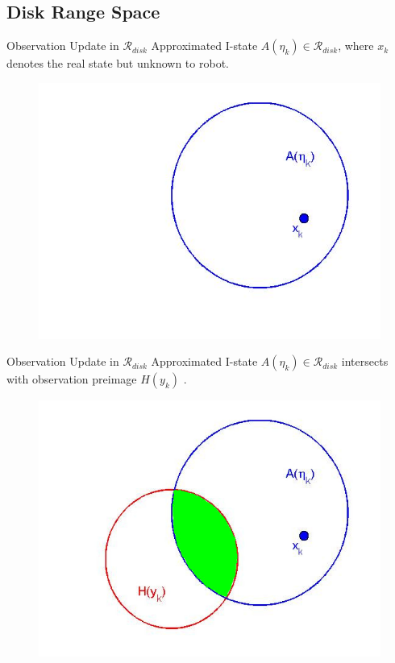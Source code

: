 \documentclass[10pt]{beamer}
\begin{document}
\subsection[Disk Range Space]{Disk Range Space}
\begin{frame}{Observation Update in $\mathcal{R}_{disk}$}
  Approximated I-state $A(\eta_k) \in \mathcal{R}_{disk}$, where $x_k$ denotes
  the real state but unknown to robot.
			
    \begin{figure}
    \includegraphics[scale=0.3]{figs/circle1_2.jpg}
    \end{figure}
 
\end{frame}

\begin{frame}{Observation Update in  $\mathcal{R}_{disk}$}
  Approximated I-state $A(\eta_k) \in \mathcal{R}_{disk}$ intersects with
  observation preimage $H(y_k)$ .
			
    \begin{figure}
    \includegraphics[scale=0.3]{figs/circle2_2.jpg}
    \end{figure}
 		
\end{frame}
\end{document}

